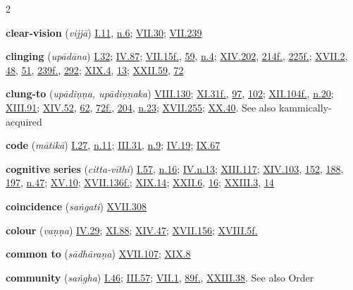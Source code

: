 \begin{multicols}{2}
\begin{vismHanging}
\par\textbf{clear-vision} (\emph{vijjā}) \hyperlink{I.11}{I.11}{}, \hyperlink{I.n6}{n.6}{}; \hyperlink{VII.30}{VII.30}{}; \hyperlink{VII.239}{VII.239}{}
\par\textbf{clinging} (\emph{upādāna}) \hyperlink{I.32}{I.32}{}; \hyperlink{IV.87}{IV.87}{}; \hyperlink{VII.15}{VII.15f.}{}, \hyperlink{VII.59}{59}{}, \hyperlink{VII.n4}{n.4}{}; \hyperlink{XIV.202}{XIV.202}{}, \hyperlink{XIV.214}{214f.}{}, \hyperlink{XIV.225}{225f.}{}; \hyperlink{XVII.2}{XVII.2}{}, \hyperlink{XVII.48}{48}{}, \hyperlink{XVII.51}{51}{}, \hyperlink{XVII.239}{239f.}{}, \hyperlink{XVII.292}{292}{}; \hyperlink{XIX.4}{XIX.4}{}, \hyperlink{XIX.13}{13}{}; \hyperlink{XXII.59}{XXII.59}{}, \hyperlink{XXII.72}{72}{}
\par\textbf{clung-to} (\emph{upādiṇṇa, upādiṇṇaka}) \hyperlink{VIII.130}{VIII.130}{}; \hyperlink{XI.31}{XI.31f.}{}, \hyperlink{XI.97}{97}{}, \hyperlink{XI.102}{102}{}; \hyperlink{XII.104}{XII.104f.}{}, \hyperlink{XII.n20}{n.20}{}; \hyperlink{XIII.91}{XIII.91}{}; \hyperlink{XIV.52}{XIV.52}{}, \hyperlink{XIV.62}{62}{}, \hyperlink{XIV.72}{72f.}{}, \hyperlink{XIV.204}{204}{}, \hyperlink{XIV.n23}{n.23}{}; \hyperlink{XVII.255}{XVII.255}{}; \hyperlink{XX.40}{XX.40}{}. See also kammically-acquired
\par\textbf{code} (\emph{mātikā}) \hyperlink{I.27}{I.27}{}, \hyperlink{I.n11}{n.11}{}; \hyperlink{III.31}{III.31}{}, \hyperlink{III.n9}{n.9}{}; \hyperlink{IV.19}{IV.19}{}; \hyperlink{IX.67}{IX.67}{}
\par\textbf{cognitive series} (\emph{citta-vīthi}) \hyperlink{I.57}{I.57}{}, \hyperlink{I.n16}{n.16}{}; \hyperlink{IV.n13}{IV.n.13}{}; \hyperlink{XIII.117}{XIII.117}{}; \hyperlink{XIV.103}{XIV.103}{}, \hyperlink{XIV.152}{152}{}, \hyperlink{XIV.188}{188}{}, \hyperlink{XIV.197}{197}{}, \hyperlink{XIV.n47}{n.47}{}; \hyperlink{XV.10}{XV.10}{}; \hyperlink{XVII.136}{XVII.136f.}{}; \hyperlink{XIX.14}{XIX.14}{}; \hyperlink{XXII.6}{XXII.6}{}, \hyperlink{XXII.16}{16}{}; \hyperlink{XXIII.3}{XXIII.3}{}, \hyperlink{XXIII.14}{14}{}
\par\textbf{coincidence} (\emph{saṅgati}) \hyperlink{XVII.308}{XVII.308}{}
\par\textbf{colour} (\emph{vaṇṇa}) \hyperlink{IV.29}{IV.29}{}; \hyperlink{XI.88}{XI.88}{}; \hyperlink{XIV.47}{XIV.47}{}; \hyperlink{XVII.156}{XVII.156}{}; \hyperlink{XVIII.5}{XVIII.5f.}{}
\par\textbf{common to} (\emph{sādhāraṇa}) \hyperlink{XVII.107}{XVII.107}{}; \hyperlink{XIX.8}{XIX.8}{}
\par\textbf{community} (\emph{saṅgha}) \hyperlink{I.46}{I.46}{}; \hyperlink{III.57}{III.57}{}; \hyperlink{VII.1}{VII.1}{}, \hyperlink{VII.89}{89f.}{}, \hyperlink{XXIII.38}{XXIII.38}{}. See also Order 

\end{vismHanging}
\end{multicols}

